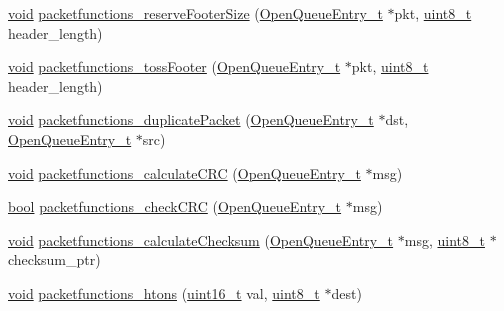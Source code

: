\begin{DoxyCompactItemize}
\item 
\hyperlink{usb__devapi_8h_afabf60e7f57651d6d595a02c75f07cd0}{void} \hyperlink{group___packet_functions_gae3cb67c149428f8b5613cacbfa1a6e24}{packetfunctions\+\_\+reserve\+Footer\+Size} (\hyperlink{struct_open_queue_entry__t}{Open\+Queue\+Entry\+\_\+t} $\ast$pkt, \hyperlink{_p_e___types_8h_aba7bc1797add20fe3efdf37ced1182c5}{uint8\+\_\+t} header\+\_\+length)
\item 
\hyperlink{usb__devapi_8h_afabf60e7f57651d6d595a02c75f07cd0}{void} \hyperlink{group___packet_functions_ga54293366b7be24efa7bb2ebc73dcee23}{packetfunctions\+\_\+toss\+Footer} (\hyperlink{struct_open_queue_entry__t}{Open\+Queue\+Entry\+\_\+t} $\ast$pkt, \hyperlink{_p_e___types_8h_aba7bc1797add20fe3efdf37ced1182c5}{uint8\+\_\+t} header\+\_\+length)
\item 
\hyperlink{usb__devapi_8h_afabf60e7f57651d6d595a02c75f07cd0}{void} \hyperlink{group___packet_functions_ga0c706bd05f894eb8506ed3ac105db914}{packetfunctions\+\_\+duplicate\+Packet} (\hyperlink{struct_open_queue_entry__t}{Open\+Queue\+Entry\+\_\+t} $\ast$dst, \hyperlink{struct_open_queue_entry__t}{Open\+Queue\+Entry\+\_\+t} $\ast$src)
\item 
\hyperlink{usb__devapi_8h_afabf60e7f57651d6d595a02c75f07cd0}{void} \hyperlink{group___packet_functions_ga16f1295774f4a73bd950ea958524884c}{packetfunctions\+\_\+calculate\+C\+RC} (\hyperlink{struct_open_queue_entry__t}{Open\+Queue\+Entry\+\_\+t} $\ast$msg)
\item 
\hyperlink{_p_e___types_8h_a97a80ca1602ebf2303258971a2c938e2}{bool} \hyperlink{group___packet_functions_ga71efba46301d8ac6a3236e90b4cf0c94}{packetfunctions\+\_\+check\+C\+RC} (\hyperlink{struct_open_queue_entry__t}{Open\+Queue\+Entry\+\_\+t} $\ast$msg)
\item 
\hyperlink{usb__devapi_8h_afabf60e7f57651d6d595a02c75f07cd0}{void} \hyperlink{group___packet_functions_ga35d4105117b00f89a87823ff34834ad9}{packetfunctions\+\_\+calculate\+Checksum} (\hyperlink{struct_open_queue_entry__t}{Open\+Queue\+Entry\+\_\+t} $\ast$msg, \hyperlink{_p_e___types_8h_aba7bc1797add20fe3efdf37ced1182c5}{uint8\+\_\+t} $\ast$checksum\+\_\+ptr)
\item 
\hyperlink{usb__devapi_8h_afabf60e7f57651d6d595a02c75f07cd0}{void} \hyperlink{group___packet_functions_ga3e26888db2ba6e41c9eb6675dfa9c5f9}{packetfunctions\+\_\+htons} (\hyperlink{_p_e___types_8h_a1f1825b69244eb3ad2c7165ddc99c956}{uint16\+\_\+t} val, \hyperlink{_p_e___types_8h_aba7bc1797add20fe3efdf37ced1182c5}{uint8\+\_\+t} $\ast$dest)
\item 

\end{DoxyCompactItemize}
